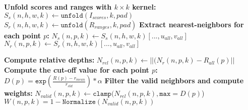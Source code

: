 \begin{algorithm}[t]
	\SetAlgoLined



	\BlankLine
    \begin{algorithmic}[1]
    
    \State \textbf{Unfold scores and ranges with $k \times k$ kernel:}
        \Statex \hspace{1em} $S_s(n,h,w,k) \gets \texttt{unfold}(I_{scores}, k, pad)$
        \Statex \hspace{1em} $S_r(n,h,w,k) \gets \texttt{unfold}(R_{ranges}, k, pad)$
    \State \textbf{Extract nearest-neighbors for each point $p$:}
        \Statex \hspace{1em} $N_s(n,p, k) \gets S_s(n,h,w,k)[..., u_{all}, v_{all}]$
        \Statex \hspace{1em} $N_r(n,p, k) \gets S_r(n,h,w,k)[..., u_{all}, v_{all}]$
    
    \State \textbf{Compute relative depths: }
        \Statex \hspace{1em} $N_{rel}(n,p,k) \gets ||(N_r(n,p, k) - R_{all}(p)||$
    \State \textbf{Compute the cut-off value for each point $p$: }
        \Statex \hspace{1em}  $D(p) = \texttt{exp}(\frac{R(p) - r_{mean}}{r_{std}}) * \alpha$
     \State \textbf{Filter the valid neighbors and compute weights: }
        \Statex \hspace{-1em} $N_{valid}(n,p,k) \gets \texttt{clamp}(N_{rel}(n,p, k), \texttt{max} = D(p)$)
        \Statex \hspace{1em} $W(n, p, k) = 1 - \texttt{Normalize}(N_{valid}(n, p, k))$


\end{algorithmic}
\end{algorithm}
